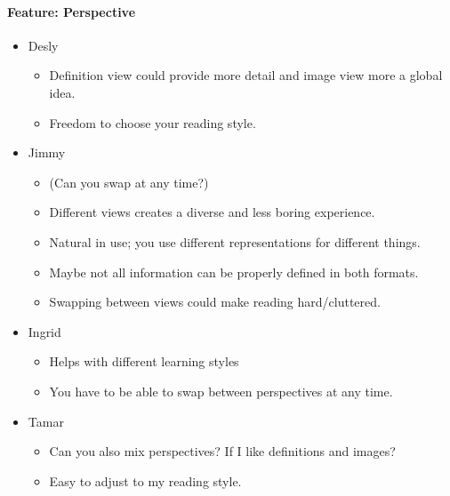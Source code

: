 \documentclass[main.tex]{subfiles}
\begin{document}
\paragraph{Feature: Perspective}
\begin{itemize}
	\item Desly
		\begin{itemize}
			\item Definition view could provide more detail and image view more a global idea.
			\item Freedom to choose your reading style.
		\end{itemize}
	\item Jimmy
		\begin{itemize}
			\item (Can you swap at any time?)
			\item Different views creates a diverse and less boring experience.
			\item Natural in use; you use different representations for different things.
			\item Maybe not all information can be properly defined in both formats.
			\item Swapping between views could make reading hard/cluttered.
		\end{itemize}
	\item Ingrid
		\begin{itemize}
			\item Helps with different learning styles
			\item You have to be able to swap between perspectives at any time. 
		\end{itemize}
	\item Tamar
		\begin{itemize}
			\item Can you also mix perspectives? If I like definitions and images?
			\item Easy to adjust to my reading style.
		\end{itemize}
 	
\end{itemize}
\end{document}

